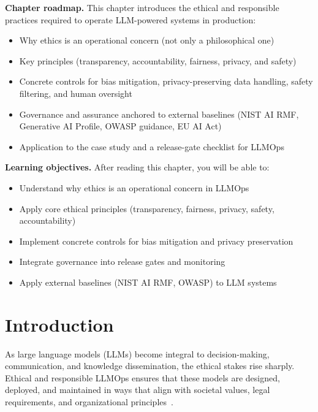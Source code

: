 \begin{tcolorbox}[
  title={\textbf{Chapter Overview}},
  colback=blue!5,
  colframe=blue!40!black,
  colbacktitle=blue!20,
  coltitle=black,
  fonttitle=\bfseries,
  boxrule=0.7pt,
  arc=4pt,
  left=5mm, right=5mm, top=4mm, bottom=4mm
]
\noindent\textbf{Chapter roadmap.}
This chapter introduces the ethical and responsible practices required to operate LLM-powered systems in production:
\begin{itemize}[leftmargin=1.5em, itemsep=3pt]
    \item Why ethics is an operational concern (not only a philosophical one)
    \item Key principles (transparency, accountability, fairness, privacy, and safety)
    \item Concrete controls for bias mitigation, privacy-preserving data handling, safety filtering, and human oversight
    \item Governance and assurance anchored to external baselines (NIST AI RMF, Generative AI Profile, OWASP guidance, EU AI Act)
    \item Application to the \ishtar{} case study and a release-gate checklist for LLMOps
\end{itemize}

\medskip
\noindent\textbf{Learning objectives.} After reading this chapter, you will be able to:
\begin{itemize}[leftmargin=1.5em, itemsep=3pt]
    \item Understand why ethics is an operational concern in LLMOps
    \item Apply core ethical principles (transparency, fairness, privacy, safety, accountability)
    \item Implement concrete controls for bias mitigation and privacy preservation
    \item Integrate governance into release gates and monitoring
    \item Apply external baselines (NIST AI RMF, OWASP) to LLM systems
\end{itemize}
\end{tcolorbox}

\section{Introduction}
\label{sec:ch11-introduction}
As large language models (LLMs) become integral to decision-making, communication, and knowledge dissemination, the ethical stakes rise sharply. Ethical and responsible LLMOps ensures that these models are designed, deployed, and maintained in ways that align with societal values, legal requirements, and organizational principles~\cite{weidinger2021,oecd_ai_principles}.

